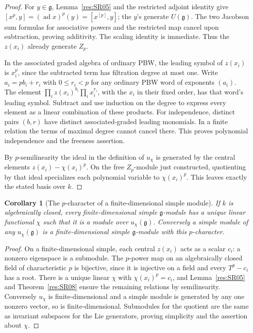 \documentclass[11pt,oneside,openany]{book}
\newtheorem{corollary}[theorem]{Corollary}
\theoremstyle{definition}
\theoremstyle{remark}
\begin{document}
\begin{proof}
For \(y\in\mathfrak g\), Lemma~\ref{res:SR05} and the
restricted adjoint identity give
\([x^p,y]=(\operatorname{ad}x)^p(y)=[x^{[p]},y]\);
the \(y\)'s generate \(U(\mathfrak g)\). The two
Jacobson sum formulas for associative powers and the
restricted map cancel upon subtraction, proving additivity.
The scaling identity is immediate. Thus the \(z(x_i)\)
already generate \(Z_p\).

In the associated graded algebra of ordinary PBW,
the leading symbol of \(z(x_i)\) is \(x_i^p\), since
the subtracted term has filtration degree at most one.
Write \(a_i=p b_i+r_i\) with \(0\le r_i<p\) for any
ordinary PBW word of exponents \((a_i)\).
The element
\(\prod_i z(x_i)^{b_i}\prod_i x_i^{r_i}\),
with the \(x_i\) in their fixed order, has that word's
leading symbol. Subtract and use induction on the degree
to express every element as a linear combination of these
products. For independence, distinct pairs \((b,r)\)
have distinct associated-graded leading monomials.
In a finite relation the terms of maximal degree cannot
cancel there. This proves polynomial independence and
the freeness assertion.

By \(p\)-semilinearity the ideal in the definition of
\(u_\chi\) is generated by the central elements
\(z(x_i)-\chi(x_i)^p\). On the free \(Z_p\)-module just
constructed, quotienting by that ideal specializes each
polynomial variable to \(\chi(x_i)^p\). This leaves exactly
the stated basis over \(k\).
\end{proof}

\begin{corollary}[The \(p\)-character of a finite-dimensional simple module]
\label{res:SR09}
If \(k\) is algebraically closed, every finite-dimensional simple
\(\mathfrak g\)-module has a unique linear functional \(\chi\)
such that it is a module over \(u_\chi(\mathfrak g)\).
Conversely a simple module of any \(u_\chi(\mathfrak g)\) is
a finite-dimensional simple \(\mathfrak g\)-module with this
\(p\)-character.
\end{corollary}

\begin{proof}
On a finite-dimensional simple, each central \(z(x_i)\)
acts as a scalar \(c_i\): a nonzero eigenspace is a
submodule. The \(p\)-power map on an algebraically closed
field of characteristic \(p\) is bijective, since it
is injective on a field and every \(T^p-c_i\) has a root.
There is a unique linear \(\chi\) with
\(\chi(x_i)^p=c_i\), and Lemma~\ref{res:SR05} and
Theorem~\ref{res:SR08} ensure the remaining relations
by semilinearity. Conversely \(u_\chi\) is finite-dimensional
and a simple module is generated by any one nonzero vector,
so is finite-dimensional. Submodules for the quotient are
the same as invariant subspaces for the Lie generators,
proving simplicity and the assertion about \(\chi\).
\end{proof}
\end{document}
